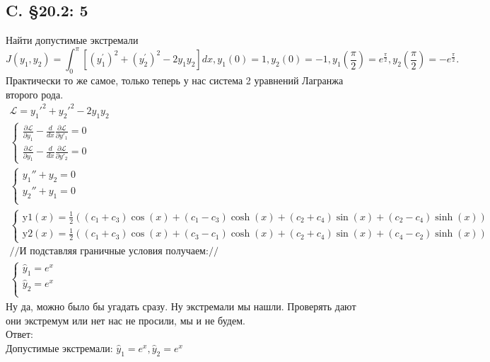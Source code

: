 \documentclass{article}
\newcommand{\Lagr}{\mathcal{L}}
\begin{document}
\subsection{C. \S20.2: 5}
Найти допустимые экстремали
\begin{equation}
J\left(y_{1}, y_{2}\right)=\int_{0}^{\pi}\left[\left(y_{1}^{\prime}\right)^{2}+\left(y_{2}^{\prime}\right)^{2}-2 y_{1} y_{2}\right] d x, y_{1}(0)=1, y_{2}(0)=-1, y_{1}\left(\frac{\pi}{2}\right)=e^{\frac{\pi}{2}}, y_{2}\left(\frac{\pi}{2}\right)=-e^{\frac{\pi}{2}} .
\end{equation}
Практически то же самое, только теперь у нас система 2 уравнений Лагранжа второго рода.
\begin{gather*}
    \Lagr = y_1'^2 + y_2'^2 -2 y_1 y_2\\
    \begin{cases}
         \frac{\partial \Lagr}{\partial y_1}  - \frac{d }{d x} \frac{\partial \Lagr}{\partial y'_1} = 0  \\
         \frac{\partial \Lagr}{\partial y_1}  - \frac{d }{d x} \frac{\partial \Lagr}{\partial y'_2} = 0  
    \end{cases}\\
    \begin{cases}
        y_1''+y_2=0\\
        y_2''+y_1=0\\
    \end{cases}\\
    \begin{cases}
        \text{y1}(x) = \frac{1}{2} ((c_1+c_3) \cos (x)+(c_1-c_3) \cosh (x)+(c_2+c_4) \sin (x)+(c_2-c_4) \sinh (x))\\
        \text{y2}(x) = \frac{1}{2} ((c_1+c_3) \cos (x)+(c_3-c_1) \cosh (x)+(c_2+c_4) \sin (x)+(c_4-c_2) \sinh (x))
    \end{cases}\\
    //\text{И подставляя граничные условия получаем:}//\\
    \begin{cases}
        \hat y_1=e^x\\
        \hat y_2 = e^{x}\\
    \end{cases}
\end{gather*}
Ну да, можно было бы угадать сразу. Ну экстремали мы нашли. Проверять дают они экстремум или нет нас не просили, мы и не будем.\\
Ответ:\\
Допустимые экстремали: $\hat y_1=e^x, \hat y_2 = e^{x}$
\end{document}
